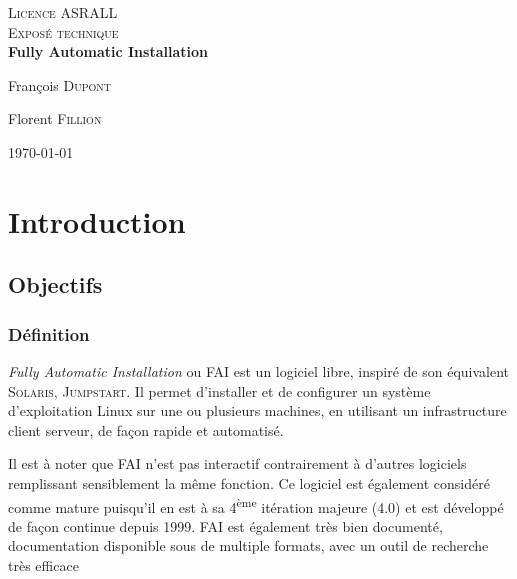 \documentclass[a4paper,12pt,one side,titlepage]{report}
\begin{document}
%
%


\begin{titlepage}
\begin{center}

\textsc{\LARGE Licence ASRALL}\\[1.5cm]

\textsc{\Large Exposé technique}\\[5.9cm]

{ \huge \bfseries Fully Automatic Installation\\[1.9cm] }

\noindent
\begin{minipage}{0.4\textwidth}
\begin{flushleft} \large
François \textsc{Dupont}
\end{flushleft}
\end{minipage}%
\begin{minipage}{0.4\textwidth}
\begin{flushright} \large
Florent \textsc{Fillion}
\end{flushright}
\end{minipage}

\vfill

{\large \today}

\end{center}
\end{titlepage}


\tableofcontents

\chapter{Introduction}
\section{Objectifs}
\subsection{Définition}
\textit{Fully Automatic Installation} ou \textsc{FAI} est un logiciel libre, inspiré de son équivalent \textsc{Solaris}, \textsc{Jumpstart}. Il permet d'installer et de configurer un système d'exploitation Linux sur une ou plusieurs machines, en utilisant un infrastructure client serveur, de façon rapide et automatisé.

Il est à noter que \textsc{FAI} n'est pas interactif contrairement à d'autres logiciels remplissant sensiblement la même fonction. Ce logiciel est également considéré comme mature puisqu'il en est à sa 4\textsuperscript{ème} itération majeure (4.0) et est développé de façon continue depuis 1999.
\textsc{FAI} est également très bien documenté, documentation disponible sous de multiple formats, avec un outil de recherche très efficace
\end{document}
